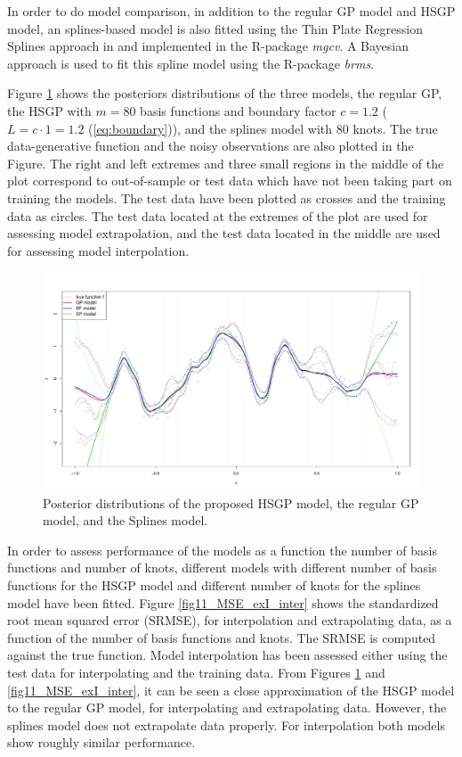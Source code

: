 \documentclass[]{interact}
\theoremstyle{plain}%
\theoremstyle{definition}
\theoremstyle{remark}
\begin{document}
In order to do model comparison, in addition to the regular GP model and HSGP model, an splines-based model is also fitted using the Thin Plate Regression Splines approach in \cite{wood2003thin} and implemented in the R-package \textit{mgcv}. A Bayesian approach is used to fit this spline model using the R-package \textit{brms}.

Figure \ref{fig10_Posteriors_exI} shows the posteriors distributions of the three models, the regular GP, the HSGP with $m=80$ basis functions and boundary factor $c=1.2$ ($L=c\cdot 1= 1.2$ (\ref{eq:boundary})), and the splines model with 80 knots. The true data-generative function and the noisy observations are also plotted in the Figure. The right and left extremes and three small regions in the middle of the plot correspond to out-of-sample or test data which have not been taking part on training the models. The test data have been plotted as crosses and the training data as circles. The test data located at the extremes of the plot are used for assessing model extrapolation, and the test data located in the middle are used for assessing model interpolation.

\begin{figure}[H]
\centering
\includegraphics[scale=0.35]{fig10_Posteriors_exI.pdf}
\caption{Posterior distributions of the proposed HSGP model, the regular GP model, and the Splines model.}
  \label{fig10_Posteriors_exI}
\end{figure}

In order to assess performance of the models as a function the number of basis functions and number of knots, different models with different number of basis functions for the HSGP model and different number of knots for the splines model have been fitted. Figure \ref{fig11_MSE_exI_inter} shows the  standardized root mean squared error (SRMSE), for interpolation and extrapolating data, as a function of the number of basis functions and knots. The SRMSE is computed against the true function. Model interpolation has been assessed either using the test data for interpolating and the training data. From Figures \ref{fig10_Posteriors_exI} and \ref{fig11_MSE_exI_inter}, it can be seen a close approximation of the HSGP model to the regular GP model, for interpolating and extrapolating data. However, the splines model does not extrapolate data properly. For interpolation both models show roughly similar performance.
\end{document}
